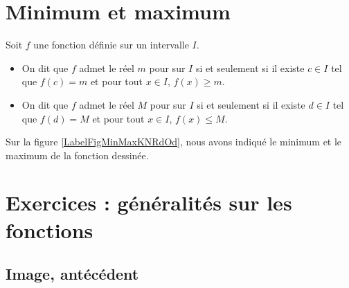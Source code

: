 \section{Minimum et maximum}

\begin{definition}
      Soit $f$ une fonction définie sur un intervalle $I$. \\[-2ex] 
      \begin{itemize}
          \item On dit que $f$ admet le réel $m$ pour 
        sur $I$ si et seulement si il existe $c\in I$ tel que $f(c)=m$
        et pour tout $x\in I$, $f(x)\geq m$. \\[-2ex]
    \item On dit que $f$ admet le réel $M$ pour 
        sur $I$ si et seulement si il existe $d\in I$ tel que $f(d)=M$ et pour tout
        $x\in I$, $f(x)\leq M$.
      \end{itemize}
\end{definition}

Sur la figure \ref{LabelFigMinMaxKNRdOd}, nous avons indiqué le minimum et le maximum de la fonction dessinée.
\newcommand{\CaptionFigMinMaxKNRdOd}{Minimum et maximum d'une fonction.}



\section{Exercices : généralités sur les fonctions}

\subsection{Image, antécédent}


